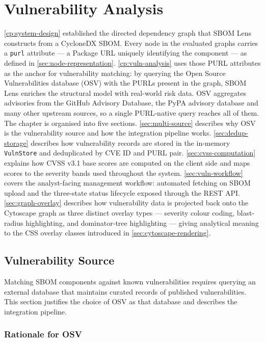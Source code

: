 \chapter[Vulnerability Analysis]{Vulnerability Analysis}
\label{cp:vuln-analysis}

\autoref{cp:system-design} established the directed dependency graph that SBOM Lens constructs from a CycloneDX SBOM. Every node in the evaluated graphs carries a \texttt{purl} attribute --- a Package URL uniquely identifying the component --- as defined in \autoref{sec:node-representation}. \autoref{cp:vuln-analysis} uses those PURL attributes as the anchor for vulnerability matching: by querying the Open Source Vulnerabilities database (OSV) with the PURLs present in the graph, SBOM Lens enriches the structural model with real-world risk data. OSV aggregates advisories from the GitHub Advisory Database, the PyPA advisory database and many other upstream sources, so a single PURL-native query reaches all of them. The chapter is organised into five sections. \autoref{sec:multi-source} describes why OSV is the vulnerability source and how the integration pipeline works. \autoref{sec:dedup-storage} describes how vulnerability records are stored in the in-memory \texttt{VulnStore} and deduplicated by CVE ID and PURL pair. \autoref{sec:cvss-computation} explains how CVSS v3.1 base scores are computed on the client side and maps scores to the severity bands used throughout the system. \autoref{sec:vuln-workflow} covers the analyst-facing management workflow: automated fetching on SBOM upload and the three-state status lifecycle exposed through the REST API. \autoref{sec:graph-overlay} describes how vulnerability data is projected back onto the Cytoscape graph as three distinct overlay types --- severity colour coding, blast-radius highlighting, and dominator-tree highlighting --- giving analytical meaning to the CSS overlay classes introduced in \autoref{sec:cytoscape-rendering}.


\section{Vulnerability Source}
\label{sec:multi-source}

Matching SBOM components against known vulnerabilities requires querying an external database that maintains curated records of published vulnerabilities. This section justifies the choice of OSV as that database and describes the integration pipeline.


\subsection{Rationale for OSV}
\label{sec:multi-source-rationale}


